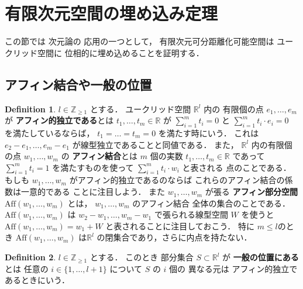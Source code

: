 \documentclass[leqno, a4paper, 12pt]{jsarticle}
\theoremstyle{plain}
\theoremstyle{definition}
\newtheorem{df}{Definition}[section]
\theoremstyle{remark}
\newcommand{\zz}{\mathbb{Z}}
\newcommand{\rr}{\mathbb{R}}
\newcommand{\yoemph}[1]{\textbf{#1}}
\newcommand{\yoaff}[1]{\mathrm{Aff}(#1)}
\numberwithin{equation}{section}
\begin{document}
\section{有限次元空間の埋め込み定理}\label{sec:embeddingdim}
この節では
次元論の
応用の一つとして，
有限次元可分距離化可能空間は
ユークリッド空間に
位相的に埋め込めることを証明する．
\subsection{アフィン結合や一般の位置}\label{subsec:preparation}

\begin{df}
$l\in \zz_{\ge 1}$
とする．
ユークリッド空間
$\rr^{l}$
内の
有限個の点
$e_{1}, \dots, e_{m}$
が
\yoemph{アフィン的独立である}とは
$t_{1}, \dots, t_{m}\in \rr$
が
$\sum_{i=1}^{m}t_{i}=0$
と
$\sum_{i=1}^{m}t_{i}\cdot e_{i}=0$
を満たしているならば，
$t_{1}=\dots =t_{m}=0$
を満たす時にいう．
これは
$e_{2}-e_{1}, \dots, e_{m}-e_{1}$
が線型独立であることと同値である．
また，
$\rr^{l}$
内の有限個の点
$w_{1}, \dots, w_{m}$
の
\yoemph{アフィン結合}とは
$m$
個の実数
$t_{1}, \dots, t_{m}\in \rr$
であって
$\sum_{i=1}^{m}t_{i}=1$
を満たすものを使って
$\sum_{i=1}^{m}t_{i}\cdot w_{i}$
と表される
点のことである．
もしも
$w_{1}, \dots, w_{m}$
がアフィン的独立であるのならば
これらのアフィン結合の係数は一意的である
ことに注目しよう．
また
$w_{1}, \dots, w_{m}$
が張る
\yoemph{アフィン部分空間
$\yoaff{w_{1}, \dots, w_{m}}$}
とは，
$w_{1}, \dots, w_{m}$
のアフィン結合
全体の集合のことである．
$\yoaff{w_{1}, \dots, w_{m}}$
は
$w_{2}-w_{1}, \dots, w_{m}-w_{1}$
で張られる線型空間
$W$
を使うと
$\yoaff{w_{1}, \dots, w_{m}}=w_{1}+W$
と表されることに注目しておこう．
特に
$m\le l$のとき
$\yoaff{w_{1}, \dots, w_{m}}$
は$\rr^{l}$
の閉集合であり，さらに内点を持たない．
\end{df}

\begin{df}
$l\in \zz_{\ge 1}$
とする．
このとき
部分集合
$S\subset \rr^{l}$
が
\yoemph{一般の位置にある}
とは
任意の
$i\in \{1, \dots, l+1\}$
について
$S$
の
$i$
個の
異なる元は
アフィン的独立であるときにいう．
\end{df}
\end{document}
